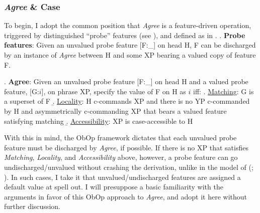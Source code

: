 \documentclass[11pt, letterpaper]{paper_nick}
\begin{document}
\subsubsection{\emph{Agree} \& Case}
To begin, I adopt the common position that \emph{Agree} is a feature-driven operation, triggered by distinguished ``probe'' features (see \Next), and defined as in \NNext.
\ex. \textbf{Probe features}: Given an unvalued probe feature [F:\_] on head H, F can be discharged by an instance of \emph{Agree} between H and some XP bearing a valued copy of feature F. 

\ex. \textbf{Agree}:
Given an unvalued probe feature [F:\_] on head H and a valued probe feature, [G:$i$], on phrase XP, specify the value of F on H as $i$ iff:
\a. \underline{Matching}: G is a superset of F
\b. \underline{Locality}: H c-commands XP and there is no YP c-commanded by H and asymmetrically c-commanding XP that bears a valued feature satisfying matching
\b. \underline{Accessibility}: XP is case-accessible to H 

With this in mind, the ObOp framework dictates that each unvalued probe feature must be discharged by \emph{Agree}, if possible. If there is no XP that satisfies \emph{Matching}, \emph{Locality}, and \emph{Accessibility} above, however, a probe feature can go undischarged/unvalued without crashing the derivation, unlike in the model of \citeauthor{chomsky00} (\citeyear{chomsky00}; \citeyear{chomsky01}). In such cases, I take it that unvalued/undischarged features are assigned a default value at spell out. I will presuppose a basic familiarity with the arguments in favor of this ObOp approach to \emph{Agree}, and adopt it here without further discussion. 
\end{document}

